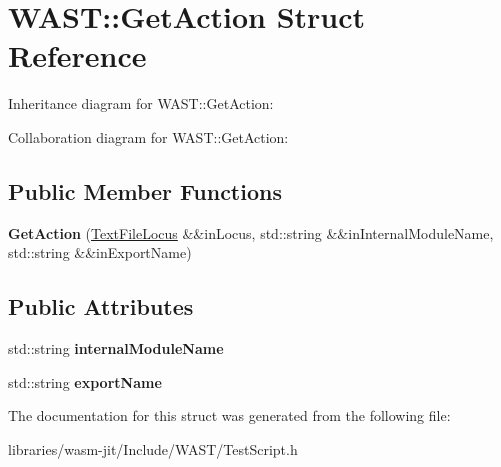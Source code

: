 \hypertarget{struct_w_a_s_t_1_1_get_action}{}\section{W\+A\+ST\+:\+:Get\+Action Struct Reference}
\label{struct_w_a_s_t_1_1_get_action}


Inheritance diagram for W\+A\+ST\+:\+:Get\+Action\+:


Collaboration diagram for W\+A\+ST\+:\+:Get\+Action\+:
\subsection*{Public Member Functions}
\begin{DoxyCompactItemize}
\item 
\mbox{\label{struct_w_a_s_t_1_1_get_action_adb4c66626445aaaa25381da7e42e7a98}} 
{\bfseries Get\+Action} (\mbox{\hyperlink{struct_w_a_s_t_1_1_text_file_locus}{Text\+File\+Locus}} \&\&in\+Locus, std\+::string \&\&in\+Internal\+Module\+Name, std\+::string \&\&in\+Export\+Name)
\end{DoxyCompactItemize}
\subsection*{Public Attributes}
\begin{DoxyCompactItemize}
\item 
\mbox{\label{struct_w_a_s_t_1_1_get_action_aef69f278cebb0e577bdb84de8f8aad3a}} 
std\+::string {\bfseries internal\+Module\+Name}
\item 
\mbox{\label{struct_w_a_s_t_1_1_get_action_a79b0352c176f79bbbc453f5e33decc95}} 
std\+::string {\bfseries export\+Name}
\end{DoxyCompactItemize}


The documentation for this struct was generated from the following file\+:\begin{DoxyCompactItemize}
\item 
libraries/wasm-\/jit/\+Include/\+W\+A\+S\+T/Test\+Script.\+h\end{DoxyCompactItemize}
